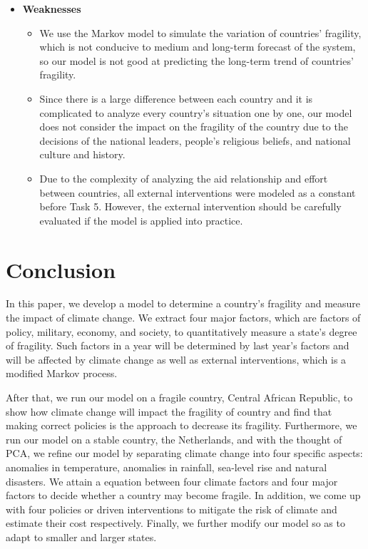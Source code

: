 \documentclass{mcmthesis}
\begin{document}
\begin{itemize}
		\item \large{\textbf{Weaknesses}}
			\normalsize
			\begin{itemize}
				\item We use the Markov model to simulate the variation of countries' fragility, which is not conducive to medium and long-term forecast of the system, so our model is not good at predicting the long-term trend of countries' fragility.
				\item Since there is a large difference between each country and it is complicated to analyze every country's situation one by one, our model does not consider the impact on the fragility of the country due to the decisions of the national leaders, people's religious beliefs, and national culture and history.
				\item Due to the complexity of analyzing the aid relationship and effort between countries, all external interventions were modeled as a constant before Task 5. However, the external intervention should be carefully evaluated if the model is applied into practice.
			\end{itemize}
	\end{itemize}

	\section{Conclusion}
		In this paper, we develop a model to determine a country's fragility and measure the impact of climate change. We extract four major factors, which are factors of policy, military, economy, and society, to quantitatively measure a state's degree of fragility. Such factors in a year will be determined by last year's factors and will be affected by climate change as well as external interventions, which is a modified Markov process. 
		
		After that, we run our model on a fragile country, Central African Republic, to show how climate change will impact the fragility of country and find that making correct policies is the approach to decrease its fragility. Furthermore, we run our model on a stable country, the Netherlands, and with the thought of PCA, we refine our model by separating climate change into four specific aspects:  anomalies in temperature, anomalies in rainfall, sea-level rise and natural disasters. We attain a equation between four climate factors and four major factors to decide whether a country may become fragile. In addition, we come up with four policies or driven interventions to mitigate the risk of climate and estimate their cost respectively. Finally, we further modify our model so as to adapt to smaller and larger states.
		
\end{document}
